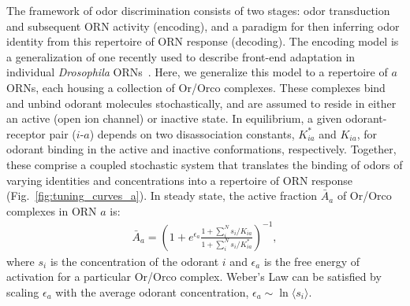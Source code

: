 The framework of odor discrimination consists of two stages: odor transduction and subsequent ORN activity (encoding), and a paradigm for then inferring odor identity from this repertoire of ORN response (decoding). The encoding model is a generalization of one recently used to describe front-end adaptation in individual \textit{Drosophila} ORNs~\cite{srinivas_elife}. %
Here, we generalize this model to a repertoire of $a$ ORNs, each housing a collection of Or/Orco complexes. These complexes bind and unbind odorant molecules stochastically, and are assumed to reside in either an active (open ion channel) or inactive state. In equilibrium, a given odorant-receptor pair ($i$-$a$) depends on two disassociation constants, $K^*_{ia}$ and $K_{ia}$, for odorant binding in the active and inactive conformations, respectively. Together, these comprise a coupled stochastic system that translates the binding of odors of varying identities and concentrations into a repertoire of ORN response (Fig.~\ref{fig:tuning_curves_a}). In steady state, the active fraction $\bar A_a$ of Or/Orco complexes in ORN $a$ is:
\begin{align}
\bar{A}_a = \left(1 + e^{\epsilon_a}\frac{1 + \sum_i^N s_i/K_{ia}}{1 + \sum_i^N s_i/K^*_{ia}}\right)^{-1},
\label{eq:steady_state_act}
\end{align}
where $s_i$ is the concentration of the odorant $i$ and $\epsilon_a$ is the free energy of activation for a particular Or/Orco complex. %
Weber's Law can be satisfied by scaling $\epsilon_a$ with the average odorant concentration, $\epsilon_a \sim \ln \langle s_i \rangle$.%








